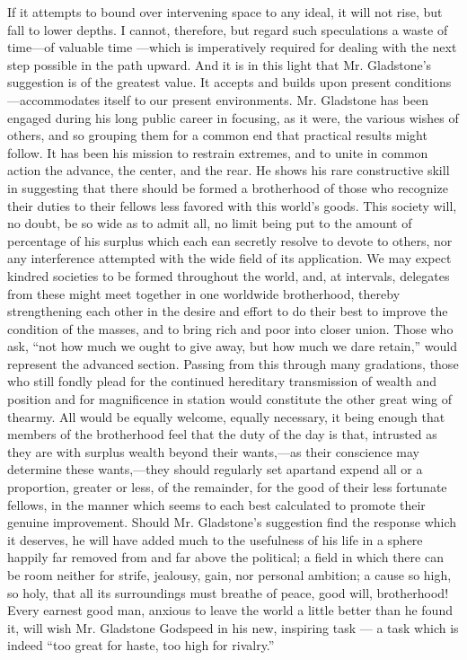 \documentclass[11pt,openany]{book}
\begin{document}
If it attempts to bound over intervening space to any ideal, it will not rise, but fall to lower depths. I cannot, therefore, but regard such speculations a waste of time---of valuable time ---which is imperatively required for dealing with the next step possible in the path upward. And it is in this light that Mr. Gladstone's suggestion is of the greatest value. It accepts and builds upon present conditions---accommodates itself to our present environments. Mr. Gladstone has been engaged during his long public career in focusing, as it were, the various wishes of others, and so grouping them for a common end that practical results might follow. It has been his mission to restrain extremes, and to unite in common action the advance, the center, and the rear. He shows his rare constructive skill in suggesting that there should be formed a brotherhood of those who recognize their duties to their fellows less favored with this world's goods. This society will, no doubt, be so wide as to admit all, no limit being put to the amount of percentage of his surplus which each ean secretly resolve to devote to others, nor any interference attempted with the wide field of its application. We may expect kindred societies to be formed throughout the world, and, at intervals, delegates from these might meet together in one worldwide brotherhood, thereby strengthening each other in the desire and effort to do their best to improve the condition of the masses, and to bring rich and poor into closer union. Those who ask, ``not how much we ought to give away, but how much we dare retain,'' would represent the advanced section. Passing from this through many gradations, those who still fondly plead for the continued hereditary transmission of wealth and position and for magnificence in station would constitute the other great wing of thearmy. All would be equally welcome, equally necessary, it being enough that members of the brotherhood feel that the duty of the day is that, intrusted as they are with surplus wealth beyond their wants,---as their conscience may determine these wants,---they should regularly set apartand expend all or a proportion, greater or less, of the remainder, for the good of their less fortunate fellows, in the manner which seems to each best calculated to promote their genuine improvement. Should Mr. Gladstone's suggestion find the response which it deserves, he will have added much to the usefulness of his life in a sphere happily far removed from and far above the political; a field in which there can be room neither for strife, jealousy, gain, nor personal ambition; a cause so high, so holy, that all its surroundings must breathe of peace, good will, brotherhood! Every earnest good man, anxious to leave the world a little better than he found it, will wish Mr. Gladstone Godspeed in his new, inspiring task --- a task which is indeed ``too great for haste, too high for rivalry.''
\end{document}
